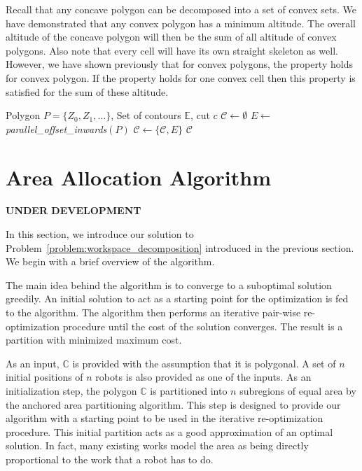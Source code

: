 \documentclass[../main.tex]{subfiles}
\begin{document}

Recall that any concave polygon can be decomposed into a set of convex sets. We have demonstrated that any convex polygon has a minimum altitude. The overall altitude of the concave polygon will then be the sum of all altitude of convex polygons. Also note that every cell will have its own straight skeleton as well. However, we have shown previously that for convex polygons, the property holds for convex polygon. If the property holds for one convex cell then this property is satisfied for the sum of these altitude.



\begin{algorithm}
	\small
	\caption{$\operatorname{recalc\_encirclements}$}
	\label{alg:update_contours}
	\begin{algorithmic}[1]
		\REQUIRE Polygon $P=\{Z_0,Z_1,\ldots\}$, Set of contours $\mathbb{E}$, cut $c$
		\STATE $\mathcal{C}\gets\emptyset$ 
		\REPEAT
			\STATE $E\gets$ \textit{parallel\_offset\_inwards}$(P)$
			\STATE $\mathcal{C}\gets\{\mathcal{C},E\}$
		\RETURN $\mathcal{C}$
	\end{algorithmic}
\end{algorithm}


\section{Area Allocation Algorithm}
\label{sec:area_allocation_algo}
\textbf{UNDER DEVELOPMENT}

In this section, we introduce our solution to Problem~\ref{problem:workspace_decomposition} introduced in the previous section. We begin with a brief overview of the algorithm.

The main idea behind the algorithm is to converge to a suboptimal solution greedily. An initial solution to act as a starting point for the optimization is fed to the algorithm. The algorithm then performs an iterative pair-wise re-optimization procedure until the cost of the solution converges. The result is a partition with minimized maximum cost. 

As an input, $\mathbb{C}$ is provided with the assumption that it is polygonal. A set of $n$ initial positions of $n$ robots is also provided as one of the inputs. As an initialization step, the polygon $\mathbb{C}$ is partitioned into $n$ subregions of equal area by the anchored area partitioning algorithm. This step is designed to provide our algorithm  with a starting point to be used in the iterative re-optimization procedure. This initial partition acts as a good approximation of an optimal solution. In fact, many existing works model the area as being directly proportional to the work that a robot has to do.
\end{document}
